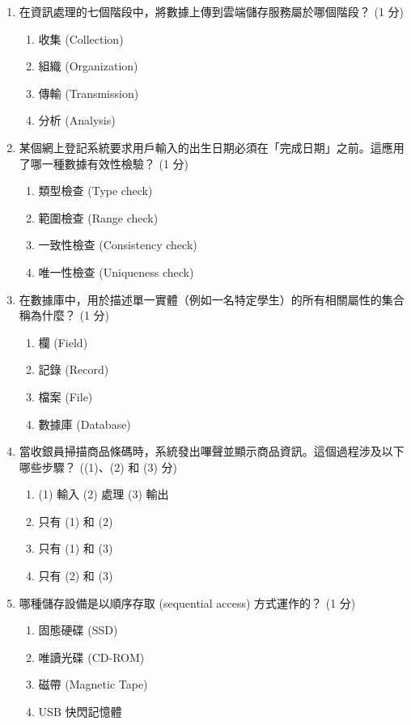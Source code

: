 \documentclass[12pt,a4paper]{article}
\begin{document}
\begin{enumerate}
    \item 在資訊處理的七個階段中，將數據上傳到雲端儲存服務屬於哪個階段？ (1 分)
    \begin{enumerate}[label=\Alph*.]
        \item 收集 (Collection)
        \item 組織 (Organization)
        \item 傳輸 (Transmission)
        \item 分析 (Analysis)
    \end{enumerate}
    
    \item 某個網上登記系統要求用戶輸入的出生日期必須在「完成日期」之前。這應用了哪一種數據有效性檢驗？ (1 分)
    \begin{enumerate}[label=\Alph*.]
        \item 類型檢查 (Type check)
        \item 範圍檢查 (Range check)
        \item 一致性檢查 (Consistency check)
        \item 唯一性檢查 (Uniqueness check)
    \end{enumerate}

    \newpage
    
    \item 在數據庫中，用於描述單一實體（例如一名特定學生）的所有相關屬性的集合稱為什麼？ (1 分)
    \begin{enumerate}[label=\Alph*.]
        \item 欄 (Field)
        \item 記錄 (Record)
        \item 檔案 (File)
        \item 數據庫 (Database)
    \end{enumerate}
    
    \item 當收銀員掃描商品條碼時，系統發出嗶聲並顯示商品資訊。這個過程涉及以下哪些步驟？ ((1)、(2) 和 (3) 分)
    \begin{enumerate}[label=\Alph*.]
        \item (1) 輸入
(2) 處理
(3) 輸出
        \item 只有 (1) 和 (2)
        \item 只有 (1) 和 (3)
        \item 只有 (2) 和 (3)
    \end{enumerate}
    
    \item 哪種儲存設備是以順序存取 (sequential access) 方式運作的？ (1 分)
    \begin{enumerate}[label=\Alph*.]
        \item 固態硬碟 (SSD)
        \item 唯讀光碟 (CD-ROM)
        \item 磁帶 (Magnetic Tape)
        \item USB 快閃記憶體
    \end{enumerate}
    

\end{enumerate}
\end{document}
